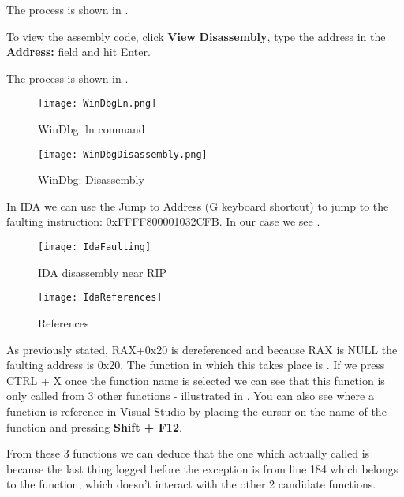 \begin{appendices}
\begin{tcolorbox}[width=\textwidth,colback={yellow},title={WinDbg},colbacktitle=yellow,coltitle=black]
	The process is shown in .

	To view the assembly code, click \textbf{View} \textrightarrow \textbf{Disassembly}, 
	type the address in the \textbf{Address:} field and hit Enter.

	The process is shown in .
\end{tcolorbox}  

\begin{figure}[]
	\centering
	\texttt{[image: WinDbgLn.png]}
	\caption{WinDbg: ln command}
	\label{fig:WinDbgLn}
\end{figure}
\begin{figure}[]
	\centering
	\texttt{[image: WinDbgDisassembly.png]}
	\caption{WinDbg: Disassembly}
	\label{fig:WinDbgDisassembly}
\end{figure}

\begin{tcolorbox}[width=\textwidth,colback={green},title={IDA},colbacktitle=green,coltitle=black]    
	In IDA we can use the Jump to Address (G keyboard shortcut) to jump to the 
	faulting instruction: 0xFFFF800001032CFB. In our case we see .
\end{tcolorbox}  

\begin{figure}
	\centering
	\texttt{[image: IdaFaulting]}
		\caption{IDA disassembly near RIP}
	\label{fig:IdaFault}
\end{figure}

\begin{figure}
	\centering
	\texttt{[image: IdaReferences]}
		\caption{ References}
	\label{fig:IdaRefs}
\end{figure}

As previously stated, RAX+0x20 is dereferenced and because RAX is NULL the faulting address is 0x20.
The function in which this takes place is . If we press CTRL + X once the
function name is selected we can see that this function is only called from 3 other functions -
illustrated in . You can also see where a function is reference in Visual Studio
by placing the cursor on the name of the function and pressing \textbf{Shift + F12}.

From these 3 functions we can deduce that the one which actually called  is
 because the last thing logged before the exception is from
 line 184 which belongs to the  function,
which doesn't interact with the other 2 candidate functions.


\end{appendices}

